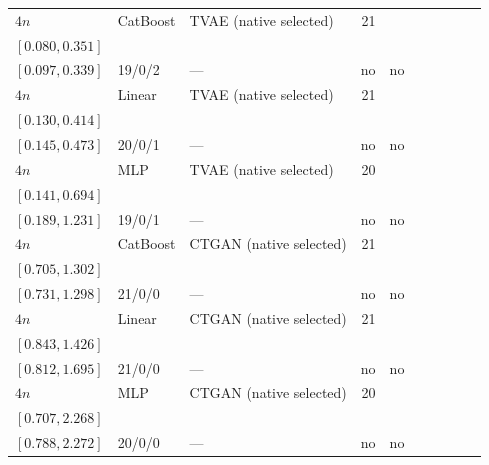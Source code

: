\begin{longtable}{@{}ll>{\raggedright\arraybackslash}p{1.1in}rllrlll@{}}
$4n$ & CatBoost & TVAE (native selected) & 21 & \begin{tabular}[t]{@{}l@{}}$0.201$\\\tiny$[0.080, 0.351]$\end{tabular} & \begin{tabular}[t]{@{}l@{}}$0.201$\\\tiny$[0.097, 0.339]$\end{tabular} & 19/0/2 & --- & no & no \\
$4n$ & Linear & TVAE (native selected) & 21 & \begin{tabular}[t]{@{}l@{}}$0.213$\\\tiny$[0.130, 0.414]$\end{tabular} & \begin{tabular}[t]{@{}l@{}}$0.262$\\\tiny$[0.145, 0.473]$\end{tabular} & 20/0/1 & --- & no & no \\
$4n$ & MLP & TVAE (native selected) & 20 & \begin{tabular}[t]{@{}l@{}}$0.286$\\\tiny$[0.141, 0.694]$\end{tabular} & \begin{tabular}[t]{@{}l@{}}$0.426$\\\tiny$[0.189, 1.231]$\end{tabular} & 19/0/1 & --- & no & no \\
$4n$ & CatBoost & CTGAN (native selected) & 21 & \begin{tabular}[t]{@{}l@{}}$0.792$\\\tiny$[0.705, 1.302]$\end{tabular} & \begin{tabular}[t]{@{}l@{}}$0.912$\\\tiny$[0.731, 1.298]$\end{tabular} & 21/0/0 & --- & no & no \\
$4n$ & Linear & CTGAN (native selected) & 21 & \begin{tabular}[t]{@{}l@{}}$0.983$\\\tiny$[0.843, 1.426]$\end{tabular} & \begin{tabular}[t]{@{}l@{}}$1.066$\\\tiny$[0.812, 1.695]$\end{tabular} & 21/0/0 & --- & no & no \\
$4n$ & MLP & CTGAN (native selected) & 20 & \begin{tabular}[t]{@{}l@{}}$1.086$\\\tiny$[0.707, 2.268]$\end{tabular} & \begin{tabular}[t]{@{}l@{}}$1.439$\\\tiny$[0.788, 2.272]$\end{tabular} & 20/0/0 & --- & no & no \\

\end{longtable}
